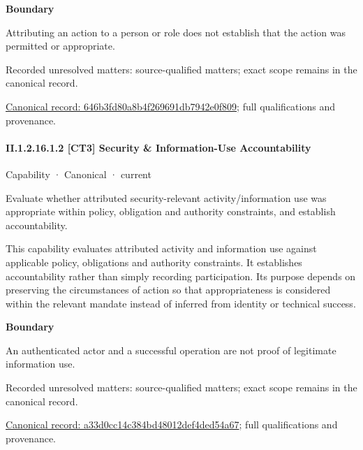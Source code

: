 \textbf{Boundary}



Attributing an action to a person or role does not establish that the action was permitted or appropriate.


{\small Recorded unresolved matters: source-qualified matters; exact scope remains in the canonical record.}\par
{\footnotesize \href{../../../../../../../continuum/strategy/capability/646b3fd80a8b4f269691db7942e0f809.md}{Canonical record: 646b3fd80a8b4f269691db7942e0f809}; full qualifications and provenance.}\par
\paragraph*{II.1.2.16.1.2 [CT3] Security \& Information-Use Accountability}
\label{navigation:II.1.2.16.1.2}

\label{element:a33d0cc14c384bd48012def4ded54a67}
{\small Capability · Canonical · current}\par

Evaluate whether attributed security-relevant activity/information use was appropriate within policy, obligation and authority constraints, and establish accountability.



This capability evaluates attributed activity and information use against applicable policy, obligations and authority constraints. It establishes accountability rather than simply recording participation. Its purpose depends on preserving the circumstances of action so that appropriateness is considered within the relevant mandate instead of inferred from identity or technical success.



\textbf{Boundary}



An authenticated actor and a successful operation are not proof of legitimate information use.


{\small Recorded unresolved matters: source-qualified matters; exact scope remains in the canonical record.}\par
{\footnotesize \href{../../../../../../../continuum/strategy/capability/a33d0cc14c384bd48012def4ded54a67.md}{Canonical record: a33d0cc14c384bd48012def4ded54a67}; full qualifications and provenance.}\par
